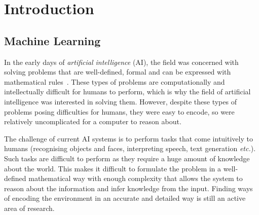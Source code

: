 \chapter{Introduction}
\label{chap:intro}
\justifying
\setlength{\parindent}{0em}

\section{Machine Learning}
In the early days of \textit{artificial intelligence} (AI), the field was concerned with solving problems that are well-defined, formal and can be expressed with mathematical rules~\cite{bernstein1958computer, minsky1956heuristic, minsky1962problems}. These types of problems are computationally and intellectually difficult for humans to perform, which is why the field of artificial intelligence was interested in solving them. However, despite these types of problems posing difficulties for humans, they were easy to encode, so were relatively uncomplicated for a computer to reason about.

The challenge of current AI systems is to perform tasks that come intuitively to humans (\eg recognising objects and faces, interpreting speech, text generation \textit{etc.}). Such tasks are difficult to perform as they require a huge amount of knowledge about the world. This makes it difficult to formulate the problem in a well-defined mathematical way with enough complexity that allows the system to reason about the information and infer knowledge from the input. Finding ways of encoding the environment in an accurate and detailed way is still an active area of research. 

